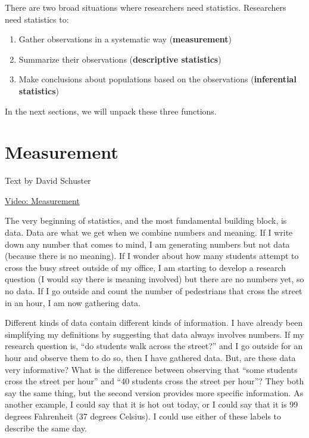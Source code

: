 \documentclass[
]{book}
\providecommand{\tightlist}{%
  \setlength{\itemsep}{0pt}\setlength{\parskip}{0pt}}
\begin{document}
There are two broad situations where researchers need statistics. Researchers need statistics to:

\begin{enumerate}
\def\labelenumi{\arabic{enumi}.}
\tightlist
\item
  Gather observations in a systematic way (\textbf{measurement})
\item
  Summarize their observations (\textbf{descriptive statistics})
\item
  Make conclusions about populations based on the observations (\textbf{inferential statistics})
\end{enumerate}

In the next sections, we will unpack these three functions.

\hypertarget{measurement}{%
\section{Measurement}\label{measurement}}

Text by David Schuster

\href{https://youtu.be/E9qRM9l5GNg}{Video: Measurement}

The very beginning of statistics, and the most fundamental building block, is data. Data are what we get when we combine numbers and meaning. If I write down any number that comes to mind, I am generating numbers but not data (because there is no meaning). If I wonder about how many students attempt to cross the busy street outside of my office, I am starting to develop a research question (I would say there is meaning involved) but there are no numbers yet, so no data. If I go outside and count the number of pedestrians that cross the street in an hour, I am now gathering data.

Different kinds of data contain different kinds of information. I have already been simplifying my definitions by suggesting that data always involves numbers. If my research question is, ``do students walk across the street?'' and I go outside for an hour and observe them to do so, then I have gathered data. But, are these data very informative? What is the difference between observing that ``some students cross the street per hour'' and ``40 students cross the street per hour''? They both say the same thing, but the second version provides more specific information. As another example, I could say that it is hot out today, or I could say that it is 99 degrees Fahrenheit (37 degrees Celsius). I could use either of these labels to describe the same day.
\end{document}
